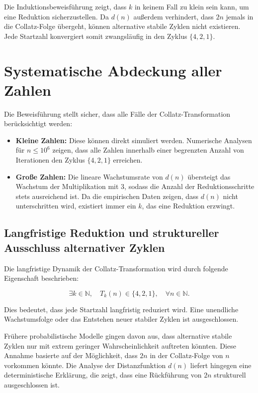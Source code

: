 \documentclass[a4paper,12pt]{article}
\begin{document}
Die Induktionsbeweisführung zeigt, dass \( k \) in keinem Fall zu klein sein kann, um eine Reduktion sicherzustellen. Da \( d(n) \) außerdem verhindert, dass \( 2n \) jemals in die Collatz-Folge übergeht, können alternative stabile Zyklen nicht existieren. Jede Startzahl konvergiert somit zwangsläufig in den Zyklus \( \{4,2,1\} \).



\section{Systematische Abdeckung aller Zahlen}

Die Beweisführung stellt sicher, dass alle Fälle der Collatz-Transformation berücksichtigt werden:

\begin{itemize}
    \item \textbf{Kleine Zahlen:} Diese können direkt simuliert werden. Numerische Analysen für \( n \leq 10^6 \) zeigen, dass alle Zahlen innerhalb einer begrenzten Anzahl von Iterationen den Zyklus \( \{4, 2, 1\} \) erreichen.
    \item \textbf{Große Zahlen:} Die lineare Wachstumsrate von \( d(n) \) übersteigt das Wachstum der Multiplikation mit 3, sodass die Anzahl der Reduktionsschritte stets ausreichend ist. Da die empirischen Daten zeigen, dass \( d(n) \) nicht unterschritten wird, existiert immer ein \( k \), das eine Reduktion erzwingt.
\end{itemize}


\subsection{Langfristige Reduktion und struktureller Ausschluss alternativer Zyklen}

Die langfristige Dynamik der Collatz-Transformation wird durch folgende Eigenschaft beschrieben:

\begin{equation}
    \exists k \in \mathbb{N}, \quad T_k(n) \in \{4,2,1\}, \quad \forall n \in \mathbb{N}.
\end{equation}

Dies bedeutet, dass jede Startzahl langfristig reduziert wird. Eine unendliche Wachstumsfolge oder das Entstehen neuer stabiler Zyklen ist ausgeschlossen.

Frühere probabilistische Modelle gingen davon aus, dass alternative stabile Zyklen nur mit extrem geringer Wahrscheinlichkeit auftreten könnten. Diese Annahme basierte auf der Möglichkeit, dass \( 2n \) in der Collatz-Folge von \( n \) vorkommen könnte. Die Analyse der Distanzfunktion \( d(n) \) liefert hingegen eine deterministische Erklärung, die zeigt, dass eine Rückführung von \( 2n \) strukturell ausgeschlossen ist.
\end{document}
